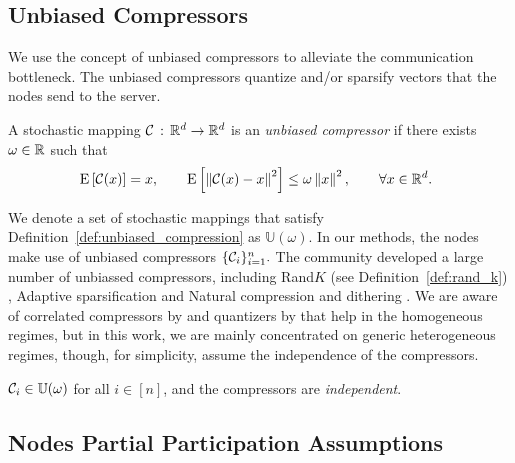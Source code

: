 \documentclass{article}
\begin{document}
\subsection{Unbiased Compressors}
We use the concept of unbiased compressors to alleviate the communication bottleneck. The unbiased compressors quantize and/or sparsify vectors that the nodes send to the server.
\begin{definition}
    \label{def:unbiased_compression}
    A stochastic mapping $\mathcal{C}\,:\,\mathbb{R}^d \rightarrow \mathbb{R}^d$ is an \textit{unbiased compressor} if
    there exists $\omega \in \mathbb{R}$ such that
    \begin{align}
        \label{eq:compressor}
        \hspace{-0.2cm}\Exp{\cC(x)} = x, \qquad \Exp{\norm{\cC(x) - x}^2} \leq \omega \norm{x}^2, \qquad \forall x \in \R^d.
    \end{align}
\end{definition}
We denote a set of stochastic mappings that satisfy Definition~\ref{def:unbiased_compression} as $\mathbb{U}(\omega).$
In our methods, the nodes make use of unbiased compressors $\{\mathcal{C}_i\}_{i=1}^n.$ 
The community developed a large number of unbiassed compressors, including Rand$K$ (see Definition~\ref{def:rand_k}) \citep{beznosikov2020biased, stich2018sparsified}, Adaptive sparsification \citep{wangni2018gradient} and Natural compression and dithering \citep{horvath2019natural}. We are aware of correlated compressors by \cite{szlendak2021permutation} and quantizers by \cite{suresh2022correlated} that help in the homogeneous regimes, but in this work, we are mainly concentrated on generic heterogeneous regimes, though, for simplicity, assume the independence of the compressors.
\begin{assumption}
\label{ass:compressors}
 $\mathcal{C}_i \in \mathbb{U}(\omega)$ for all $i\in [n]$, and the compressors are  \textit{independent}.
\end{assumption}

\subsection{Nodes Partial Participation Assumptions}
\label{sec:partial_participation}

\newcommand\Item[1][]{%
  \ifx\relax#1\relax  \item \else \item[#1] \fi
  \abovedisplayskip=0pt\abovedisplayshortskip=0pt~\vspace*{-\baselineskip}}
\end{document}
